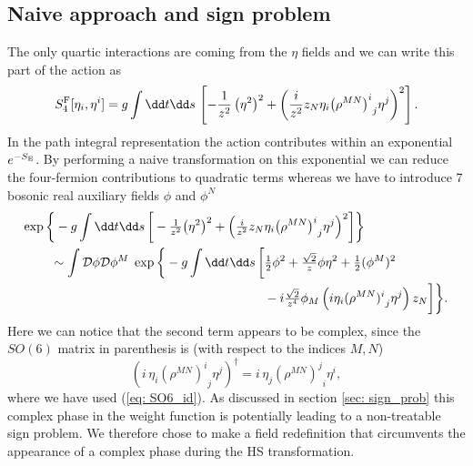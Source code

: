 \subsection{Naive approach and sign problem}
The only quartic interactions are coming from the $\eta$ fields and we can write this part of the action as
%
%
\begin{equation}
S^{\rm F}_{4} [\eta_{i},\eta^{i}] = g \int \dd t \dd s \, \left[-\frac{1}{z^{2}}\left(\eta^{2}\right)^{2} + \left(\frac{i}{z^{2}}z_{N}
\eta_{i}{\left(\rho^{MN}\right)^{i}}_{j}\eta^{j}\right)^{2} \right].
\label{eqq: S_4}
\end{equation}
%
%
In the path integral representation the  action contributes within an exponential $e^{-S_{\rm E}}$. By performing a naive  transformation on this exponential we can reduce the four-fermion contributions to quadratic  terms whereas we have to introduce 7 bosonic real auxiliary fields $\phi$ and $\phi^{N}$
%
%
\begin{align}
\exp \bigg\lbrace -g \int \dd t \dd s \, \bigg[-\tfrac{1}{z^{2}} \big(\eta^{2}\big)^{2} + \Big(\tfrac{i}{z^{2}}z_{N}
& \eta_{i}{\big(\rho^{MN}\big)^{i}}_{j}\eta^{j}\Big)^{2} \bigg] \bigg\rbrace \\
%
%
\sim \int \mathcal{D}\phi \mathcal{D}\phi^{M}\; \exp\bigg\lbrace -g \int \dd t \dd s \, \bigg[ &\tfrac{1}{2}\phi^{2} + \tfrac{\sqrt{2}}{z}\phi\eta^{2} +\tfrac{1}{2} (\phi^{M})^{2} \notag \\
 &- i\tfrac{\sqrt{2}}{z^{4}} \phi_{M} \left( i\eta_{i}{(\rho^{MN})^{i}}_{j}\eta^{j}\right) z_{N} \bigg] \bigg\rbrace. \notag
\end{align}
%
%
Here we can notice that the second term appears to be complex, since the $SO(6)$ matrix in parenthesis is  (with respect to the indices $M,N$)
%
%
\begin{equation}
\left( i \,\eta_{i} {\left(\rho^{MN}\right)^{i}}_{j}\eta^{j}\right)^{\dagger} = i\, \eta_{j} {\left(\rho^{MN}\right)^{j}}_{i}\eta^{i},
\end{equation}
%
%
where we have used (\ref{eq: SO6_id}). As discussed in section \ref{sec: sign_prob} this complex phase in the weight function is potentially leading to a non-treatable sign problem. We therefore chose to make a field redefinition that circumvents the appearance of a complex phase during the HS transformation.
%
%
%
%
%
%
